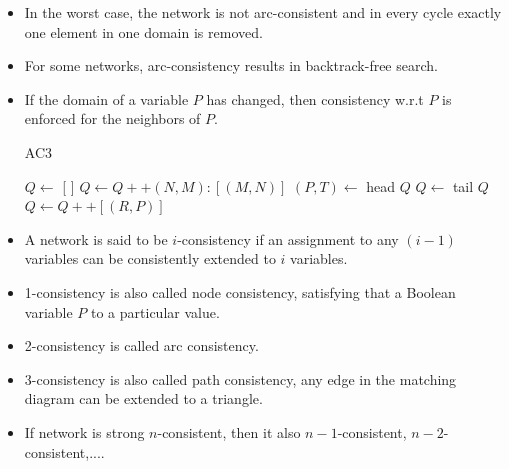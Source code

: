 \documentclass[a4paper]{article}
\begin{document}
\begin{itemize}
    \begin{algorithm}[H]
        \caption{AC1}
        \begin{algorithmic}[1]
            \Statex {}
            \Repeat
                    \State {}
                    \State {}
                \EndFor
        \end{algorithmic}
    \end{algorithm}
    \item In the worst case, the network is not arc-consistent and in every cycle exactly one element in one domain is removed.
    \item For some networks, arc-consistency results in backtrack-free search.
    \item If the domain of a variable $P$ has changed, then consistency w.r.t $P$ is enforced for the neighbors of $P$.
    \begin{algorithm}[H]
        \caption{AC3}
        \begin{algorithmic}[1]
            \Statex {}
            \State $Q\gets$ [ ]
                \State $Q\gets Q++(N,M):[(M,N)]$
            \EndFor
                \State $(P,T)\gets$ head $Q$
                \State $Q\gets$ tail $Q$
                \State {}
                        \State $Q\gets Q++[(R,P)]$
                    \EndFor
                \EndIf
            \EndWhile
        \end{algorithmic}
    \end{algorithm}
    \item A network is said to be $i$-consistency if an assignment to any $(i-1)$ variables can be consistently extended to $i$ variables.
    \item 1-consistency is also called node consistency, satisfying that a Boolean variable $P$ to a particular value.
    \item 2-consistency is called arc consistency.
    \item 3-consistency is also called path consistency, any edge in the matching diagram can be extended to a triangle.
    \item If network is strong $n$-consistent, then it also $n-1$-consistent, $n-2$-consistent,$...$.

\end{itemize}
\end{document}
